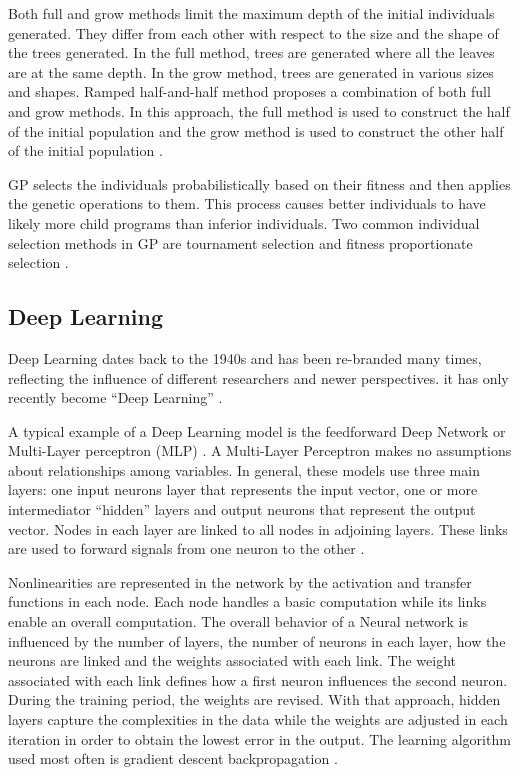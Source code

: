 \documentclass[journal]{IEEEtran}
\begin{document}
Both full and grow methods limit the maximum depth of the initial individuals generated. They differ from each other with respect to the size and the shape of the trees generated. In the full method, trees are generated where all the leaves are at the same depth. In the grow method, trees are generated in various sizes and shapes. Ramped half-and-half method proposes a combination of both full and grow methods. In this approach, the full method is used to construct the half of the initial population and the grow method is used to construct the other half of the initial population \cite{poli2008field}.

GP selects the individuals probabilistically based on their fitness and then applies the genetic operations to them. This process causes better individuals to have likely more child programs than inferior individuals. Two common individual selection methods in GP are tournament selection and fitness proportionate selection \cite{poli2008field}.

\vspace{-0.3cm}
\subsection{Deep Learning}

Deep Learning dates back to the 1940s and has been re-branded many times, reflecting the influence of different researchers and newer perspectives. it has only recently become “Deep Learning” \cite{bengio2015deep}.

A typical example of a Deep Learning model is the feedforward Deep Network or Multi-Layer perceptron (MLP) \cite{bengio2015deep}. A Multi-Layer Perceptron makes no assumptions about relationships among variables. In general, these models use three main layers: one input neurons layer that represents the input vector, one or more intermediator “hidden” layers and output neurons that represent the output vector. Nodes in each layer are linked to all nodes in adjoining layers. These links are used to forward signals from one neuron to the other \cite{mushtaq2012empirical} \cite{comrie1997comparing}.

Nonlinearities are represented in the network by the activation and transfer functions in each node. Each node handles a basic computation while its links enable an overall computation. The overall behavior of a Neural network is influenced by the number of layers, the number of neurons in each layer, how the neurons are linked and the weights associated with each link. The weight associated with each link defines how a first neuron influences the second neuron. During the training period, the weights are revised. With that approach, hidden layers capture the complexities in the data while the weights are adjusted in each iteration in order to obtain the lowest error in the output. The learning algorithm used most often is gradient descent backpropagation \cite{mushtaq2012empirical} \cite{bengio2015deep} \cite{comrie1997comparing}.
\end{document}
